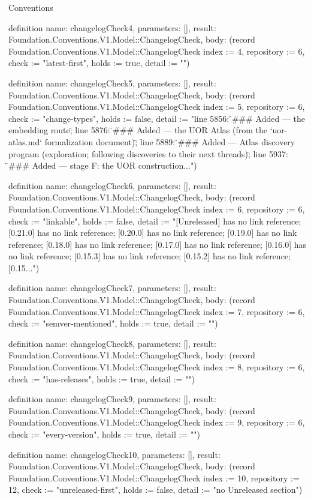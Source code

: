 \begin{lexlean}{Conventions}
\begin{semanticmodule}
definition{
  name: changelogCheck4,
  parameters: [],
  result: Foundation.Conventions.V1.Model::ChangelogCheck,
  body: (record Foundation.Conventions.V1.Model::ChangelogCheck {index := 4, repository := 6, check := "latest-first", holds := true, detail := ""})
}

definition{
  name: changelogCheck5,
  parameters: [],
  result: Foundation.Conventions.V1.Model::ChangelogCheck,
  body: (record Foundation.Conventions.V1.Model::ChangelogCheck {index := 5, repository := 6, check := "change-types", holds := false, detail := "line 5856: \"### Added — the embedding route\"; line 5876: \"### Added — the UOR Atlas (from the `uor-atlas.md` formalization document)\"; line 5889: \"### Added — Atlas discovery program (exploration; following discoveries to their next threads)\"; line 5937: \"### Added — stage F: the UOR construction..."})
}

definition{
  name: changelogCheck6,
  parameters: [],
  result: Foundation.Conventions.V1.Model::ChangelogCheck,
  body: (record Foundation.Conventions.V1.Model::ChangelogCheck {index := 6, repository := 6, check := "linkable", holds := false, detail := "[Unreleased] has no link reference; [0.21.0] has no link reference; [0.20.0] has no link reference; [0.19.0] has no link reference; [0.18.0] has no link reference; [0.17.0] has no link reference; [0.16.0] has no link reference; [0.15.3] has no link reference; [0.15.2] has no link reference; [0.15..."})
}

definition{
  name: changelogCheck7,
  parameters: [],
  result: Foundation.Conventions.V1.Model::ChangelogCheck,
  body: (record Foundation.Conventions.V1.Model::ChangelogCheck {index := 7, repository := 6, check := "semver-mentioned", holds := true, detail := ""})
}

definition{
  name: changelogCheck8,
  parameters: [],
  result: Foundation.Conventions.V1.Model::ChangelogCheck,
  body: (record Foundation.Conventions.V1.Model::ChangelogCheck {index := 8, repository := 6, check := "has-releases", holds := true, detail := ""})
}

definition{
  name: changelogCheck9,
  parameters: [],
  result: Foundation.Conventions.V1.Model::ChangelogCheck,
  body: (record Foundation.Conventions.V1.Model::ChangelogCheck {index := 9, repository := 6, check := "every-version", holds := true, detail := ""})
}

definition{
  name: changelogCheck10,
  parameters: [],
  result: Foundation.Conventions.V1.Model::ChangelogCheck,
  body: (record Foundation.Conventions.V1.Model::ChangelogCheck {index := 10, repository := 12, check := "unreleased-first", holds := false, detail := "no Unreleased section"})
}


\end{semanticmodule}
\end{lexlean}
